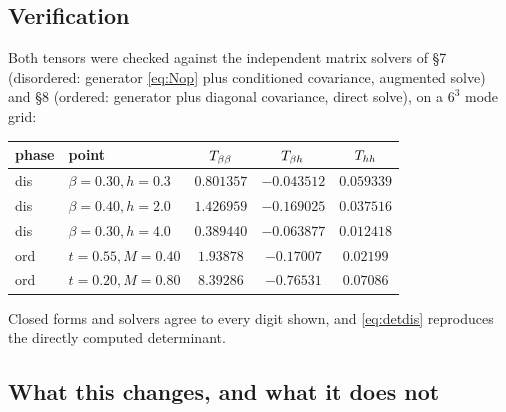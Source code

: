 \subsection{Verification}
Both tensors were checked against the independent matrix solvers of \S7 (disordered:
generator \eqref{eq:Nop} plus conditioned covariance, augmented solve) and \S8 (ordered:
generator plus diagonal covariance, direct solve), on a $6^{3}$ mode grid:
\begin{center}
\begin{tabular}{llccc}
\hline
phase & point & $T_{\beta\beta}$ & $T_{\beta h}$ & $T_{hh}$\\
\hline
dis & $\beta{=}0.30,h{=}0.3$ & $0.801357$ & $-0.043512$ & $0.059339$\\
dis & $\beta{=}0.40,h{=}2.0$ & $1.426959$ & $-0.169025$ & $0.037516$\\
dis & $\beta{=}0.30,h{=}4.0$ & $0.389440$ & $-0.063877$ & $0.012418$\\
ord & $t{=}0.55,M{=}0.40$    & $1.93878$  & $-0.17007$  & $0.02199$\\
ord & $t{=}0.20,M{=}0.80$    & $8.39286$  & $-0.76531$  & $0.07086$\\
\hline
\end{tabular}
\end{center}
Closed forms and solvers agree to every digit shown, and \eqref{eq:detdis} reproduces the
directly computed determinant.

\subsection{What this changes, and what it does not}
